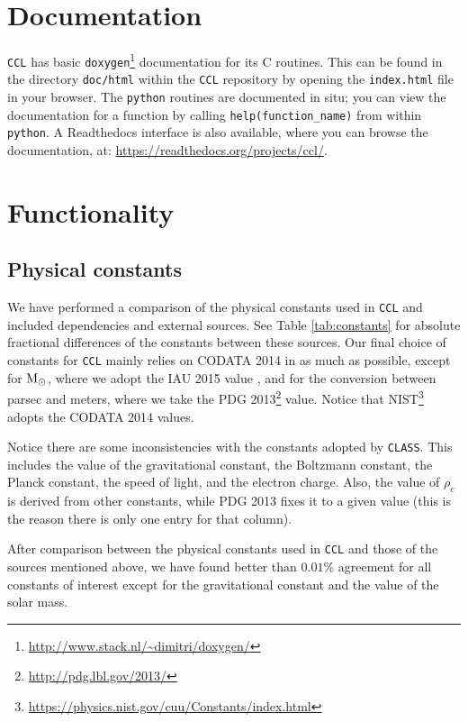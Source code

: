 \documentclass[\docopts]{\docclass}
\newcommand{\ccl}{{\tt CCL}\xspace}
\begin{document}
\section{Documentation}
\label{sec:doc}

\ccl has basic {\tt doxygen}\footnote{\url{http://www.stack.nl/~dimitri/doxygen/}} documentation for its C routines. This can be found in the directory {\tt doc/html} within the \ccl repository by opening the {\tt index.html} file in your browser. The {\tt python} routines are documented in situ; you can view the documentation for a function by calling {\tt help(function\_name)} from within {\tt python}. A Readthedocs interface is also available, where you can browse the documentation, at: \url{https://readthedocs.org/projects/ccl/}.

\section{Functionality}
\label{sec:func}

\subsection{Physical constants}
\label{sec:constants}
We have performed a comparison of the physical constants used in \ccl and included dependencies and external sources. See Table \ref{tab:constants} for absolute fractional differences of the constants between these sources. Our final choice of constants for \ccl mainly relies on CODATA 2014 \citep{CODATA14} in as much as possible, except for ${\rm M}_\odot$, where we adopt the IAU 2015 value \citep{IAU15}, and for the conversion between parsec and meters, where we take the PDG 2013\footnote{\url{http://pdg.lbl.gov/2013/}} value. Notice that NIST\footnote{\url{https://physics.nist.gov/cuu/Constants/index.html}} adopts the CODATA 2014 values.

Notice there are some inconsistencies with the constants adopted by {\tt CLASS}. This includes the value of the gravitational constant, the Boltzmann constant, the Planck constant, the speed of light, and the electron charge. Also, the value of $\rho_c$ is derived from other constants, while PDG 2013 fixes it to a given value (this is the reason there is only one entry for that column).

After comparison between the physical constants used in \ccl and those of the sources mentioned above, we have found better than $0.01\%$ agreement for all constants of interest except for the gravitational constant and the value of the solar mass.
\end{document}
